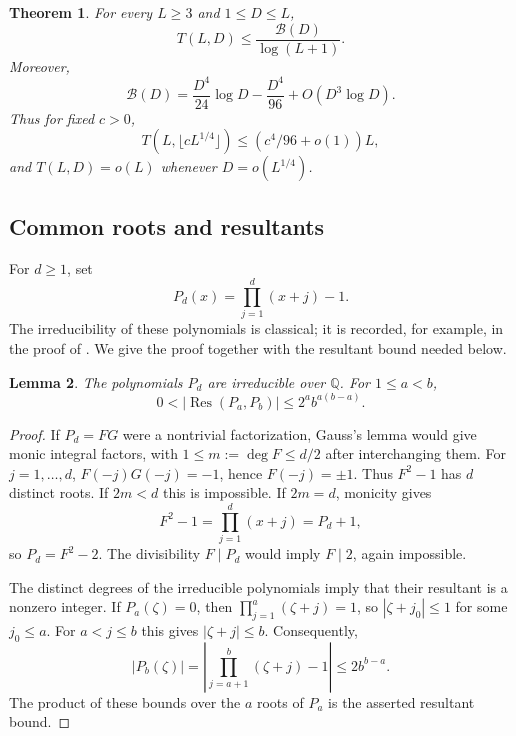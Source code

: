 \documentclass[11pt]{amsart}
\newtheorem{theorem}{Theorem}[section]
\newtheorem{lemma}[theorem]{Lemma}
\theoremstyle{definition}
\theoremstyle{remark}
\begin{document}
\begin{theorem}\label{thm:shorttriples}
For every $L\geq3$ and $1\leq D\leq L$,
\[
T(L,D)\leq\frac{\mathcal B(D)}{\log(L+1)}.
\]
Moreover,
\[
\mathcal B(D)=\frac{D^4}{24}\log D-\frac{D^4}{96}+O(D^3\log D).
\]
Thus for fixed $c>0$,
\[
T(L,\lfloor cL^{1/4}\rfloor)\leq(c^4/96+o(1))L,
\]
and $T(L,D)=o(L)$ whenever $D=o(L^{1/4})$.
\end{theorem}

\subsection{Common roots and resultants}
For $d\geq1$, set
\[
P_d(x)=\prod_{j=1}^d(x+j)-1.
\]
The irreducibility of these polynomials is classical; it is recorded, for
example, in the proof of \cite[Theorem~2.1]{KlurmanMunsch}. We give the
proof together with the resultant bound needed below.

\begin{lemma}\label{lem:resultantheight}
The polynomials $P_d$ are irreducible over $\mathbb Q$. For $1\leq a<b$,
\[
0<|\operatorname{Res}(P_a,P_b)|\leq2^a b^{a(b-a)}.
\]
\end{lemma}
\begin{proof}
If $P_d=FG$ were a nontrivial factorization, Gauss's lemma would give
monic integral factors, with $1\leq m:=\deg F\leq d/2$ after
interchanging them. For $j=1,\ldots,d$, $F(-j)G(-j)=-1$, hence
$F(-j)=\pm1$. Thus $F^2-1$ has $d$ distinct roots. If $2m<d$ this is
impossible. If $2m=d$, monicity gives
\[
F^2-1=\prod_{j=1}^d(x+j)=P_d+1,
\]
so $P_d=F^2-2$. The divisibility $F\mid P_d$ would imply $F\mid2$,
again impossible.

The distinct degrees of the irreducible polynomials imply that their
resultant is a nonzero integer. If $P_a(\zeta)=0$, then
$\prod_{j=1}^a(\zeta+j)=1$, so $|\zeta+j_0|\leq1$ for some
$j_0\leq a$. For $a<j\leq b$ this gives $|\zeta+j|\leq b$.
Consequently,
\[
|P_b(\zeta)|=
\left|\prod_{j=a+1}^b(\zeta+j)-1\right|
\leq2b^{b-a}.
\]
The product of these bounds over the $a$ roots of $P_a$ is the asserted
resultant bound.
\end{proof}
\end{document}
